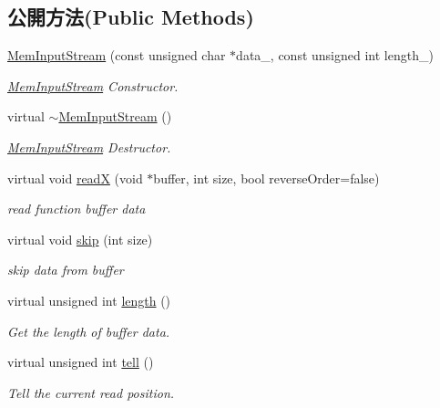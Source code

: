 \subsection*{公開方法(Public Methods)}
\begin{DoxyCompactItemize}
\item 
\hyperlink{class_magnum_1_1_mem_input_stream_a2f936e06489b17b08fe2a4e26d5f1524}{Mem\+Input\+Stream} (const unsigned char $\ast$data\+\_\+, const unsigned int length\+\_\+)
\begin{DoxyCompactList}\small\item\em \hyperlink{class_magnum_1_1_mem_input_stream}{Mem\+Input\+Stream} Constructor. \end{DoxyCompactList}\item 
virtual \hyperlink{class_magnum_1_1_mem_input_stream_a0bea7e162851acf927fd49e693618ed5}{$\sim$\+Mem\+Input\+Stream} ()
\begin{DoxyCompactList}\small\item\em \hyperlink{class_magnum_1_1_mem_input_stream}{Mem\+Input\+Stream} Destructor. \end{DoxyCompactList}\item 
virtual void \hyperlink{class_magnum_1_1_mem_input_stream_a46a5d350cad7a038b4e12d5698b5a4ba}{readX} (void $\ast$buffer, int size, bool reverse\+Order=false)
\begin{DoxyCompactList}\small\item\em read function buffer data \end{DoxyCompactList}\item 
virtual void \hyperlink{class_magnum_1_1_mem_input_stream_a9333680c5aa2ec6bcabfd15220c82e58}{skip} (int size)
\begin{DoxyCompactList}\small\item\em skip data from buffer \end{DoxyCompactList}\item 
virtual unsigned int \hyperlink{class_magnum_1_1_mem_input_stream_afe3986e5078df73b8ad7fd058964fa0c}{length} ()
\begin{DoxyCompactList}\small\item\em Get the length of buffer data. \end{DoxyCompactList}\item 
virtual unsigned int \hyperlink{class_magnum_1_1_mem_input_stream_a533bcf2b8e5b63c080656824fae97aa9}{tell} ()
\begin{DoxyCompactList}\small\item\em Tell the current read position. \end{DoxyCompactList}\item 

\end{DoxyCompactItemize}
